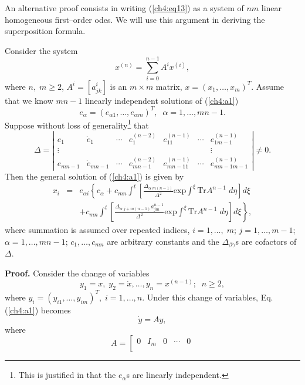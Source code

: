 {An alternative proof consists in writing (\ref{ch4:eq13}) as a system of $nm$ 
linear homogeneous first--order odes. We will use this argument in deriving
the superposition formula.
\begin{theo}
\begin{em}
Consider the system
\begin{equation}
x^{(n)}=\sum_{i=0}^{n-1}A^{i}x^{(i)}, \label{ch4:a1} 
\end{equation}
where $n,\; m\ge 2$, $A^i=[a_{jk}^i]$ is an $m\times m$ matrix,
$x=(x_1,\ldots ,x_m)^T$. Assume that we know $mn-1$ linearly independent 
solutions of (\ref{ch4:a1})
\[e_{\alpha}=(e_{\alpha 1},\ldots,e_{\alpha m})^T,\;\;\alpha=1,\ldots,mn-1.\]
Suppose without loss of generality\footnote{ This is justified in 
that the $e_{\alpha}$s are linearly independent.} that
\[ \Delta=\left | \begin{array}{ccccccc}
e_1 & \dot e_1 &\cdots &e_1^{(n-2)}&e_{11}^{(n-1)}&\cdots &e_{1m-1}^{(n-1)}\\
\vdots & & & & & & \vdots\\
e_{mn-1} & \dot e_{mn-1} &\cdots &e_{mn-1}^{(n-2)}&
e_{mn-11}^{(n-1)}&\cdots &e_{mn-1m-1}^{(n-1)}
\end{array}\right |\ne 0.\]
Then the general solution of (\ref{ch4:a1}) is given by
\begin{eqnarray}
x_{i} &= & e_{\alpha i} \left \{c_{\alpha}+c_{mn}\int^t\left [
\frac{\Delta_{\alpha\; m(n-1)}}{\Delta^2}\mbox{exp}\int^{\xi}\mbox{Tr}A^{n-1}
\;d\eta \right ]d\xi \right. \nonumber\\
& &\left. +c_{mn}\int^t\left [\frac{\Delta_{\alpha\;j+m(n-1)}a_{jm}^{n-1}}
{\Delta^2}\mbox{exp}\int^{\xi}\mbox{Tr}A^{n-1}\;d\eta\right ]d\xi \right \},
\label{ch4:a2}
\end{eqnarray}
where summation is assumed over repeated indices,
$i=1,\ldots ,\;m$; $j=1,\ldots,m-1$; $\alpha=1,\dots,mn-1$; 
$c_1,\dots,c_{mn}$ are arbitrary constants and the $\Delta_{\beta \gamma}$s
are cofactors of $\Delta$. 
\end{em}
\end{theo}
{\bf Proof.} Consider the change of variables
\[y_1=x,\; y_2=\dot x,\ldots,y_n=x^{(n-1)};\;\;n\ge 2, \]
where $y_i=(y_{i1},\ldots,y_{im})^T,\;i=1,\dots,n$. Under this change of
variables, Eq. (\ref{ch4:a1}) becomes
\begin{equation}
\dot y=Ay , \label{ch4:a3}
\end{equation}
where
\[A= \left [ \begin{array}{ccccc}
0 & I_m & 0 & \cdots &0\\

\end{array}\]}
